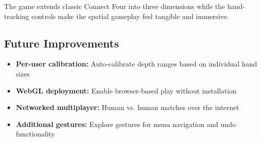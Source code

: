 \documentclass[11pt]{article}
\begin{document}
The game extends classic Connect Four into three dimensions while the hand-tracking controls make the spatial gameplay feel tangible and immersive.

\subsection{Future Improvements}

\begin{itemize}
    \item \textbf{Per-user calibration:} Auto-calibrate depth ranges based on individual hand sizes
    \item \textbf{WebGL deployment:} Enable browser-based play without installation
    \item \textbf{Networked multiplayer:} Human vs. human matches over the internet
    \item \textbf{Additional gestures:} Explore gestures for menu navigation and undo functionality
\end{itemize}
\end{document}
